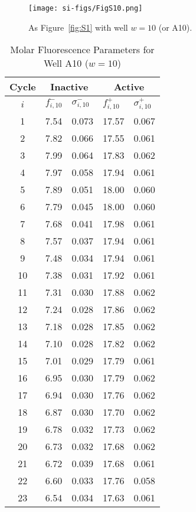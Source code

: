                 \begin{figure}
                    \centering
                    \texttt{[image: si-figs/FigS10.png]}
                    \caption{
                        As Figure~\ref{fig:S1} with well $w=10$ (or A10).
                    }
                \end{figure}
                \clearpage
    \begin{table}
        \caption{Molar Fluorescence Parameters for Well A10 ($w=10$)}
        \centering
        \begin{tabular}{c|ll|ll}
            Cycle & \multicolumn{2}{c|}{Inactive} & \multicolumn{2}{c}{Active} \\
            \hline
            $i$ & $f_{i,10}^{-}$ & $\sigma_{i,10}^{-}$ &  $f_{i,10}^{+}$ & $\sigma_{i,10}^{+}$ \\
            \hline
    1 & 7.54 & 0.073 & 17.57 & 0.067 \\
2 & 7.82 & 0.066 & 17.55 & 0.061 \\
3 & 7.99 & 0.064 & 17.83 & 0.062 \\
4 & 7.97 & 0.058 & 17.94 & 0.061 \\
5 & 7.89 & 0.051 & 18.00 & 0.060 \\
6 & 7.79 & 0.045 & 18.00 & 0.060 \\
7 & 7.68 & 0.041 & 17.98 & 0.061 \\
8 & 7.57 & 0.037 & 17.94 & 0.061 \\
9 & 7.48 & 0.034 & 17.94 & 0.061 \\
10 & 7.38 & 0.031 & 17.92 & 0.061 \\
11 & 7.31 & 0.030 & 17.88 & 0.062 \\
12 & 7.24 & 0.028 & 17.86 & 0.062 \\
13 & 7.18 & 0.028 & 17.85 & 0.062 \\
14 & 7.10 & 0.028 & 17.82 & 0.062 \\
15 & 7.01 & 0.029 & 17.79 & 0.061 \\
16 & 6.95 & 0.030 & 17.79 & 0.062 \\
17 & 6.94 & 0.030 & 17.76 & 0.062 \\
18 & 6.87 & 0.030 & 17.70 & 0.062 \\
19 & 6.78 & 0.032 & 17.73 & 0.062 \\
20 & 6.73 & 0.032 & 17.68 & 0.062 \\
21 & 6.72 & 0.039 & 17.68 & 0.061 \\
22 & 6.60 & 0.033 & 17.76 & 0.058 \\
23 & 6.54 & 0.034 & 17.63 & 0.061 \\

\end{tabular}
\end{table}
